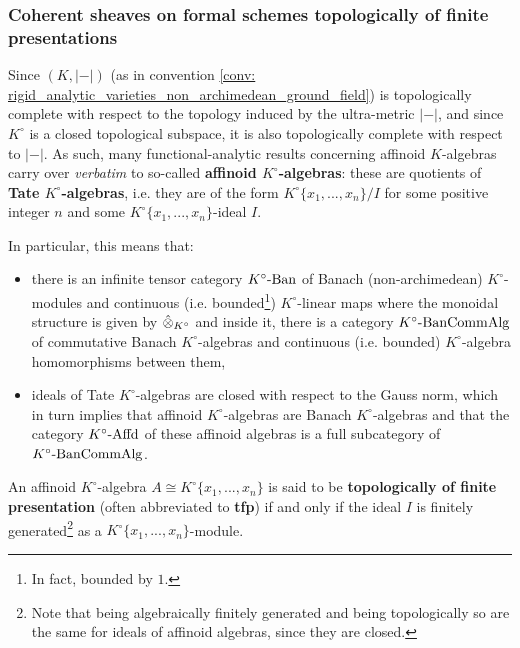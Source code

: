         \subsubsection{Coherent sheaves on formal schemes topologically of finite presentations}
            \begin{remark} \label{remark: affinoids_over_complete_valuation_rings}
                Since $(K, |-|)$ (as in convention \ref{conv: rigid_analytic_varieties_non_archimedean_ground_field}) is topologically complete with respect to the topology induced by the ultra-metric $|-|$, and since $K^{\circ}$ is a closed topological subspace, it is also topologically complete with respect to $|-|$. As such, many functional-analytic results concerning affinoid $K$-algebras carry over \textit{verbatim} to so-called \textbf{affinoid $K^{\circ}$-algebras}: these are quotients of \textbf{Tate $K^{\circ}$-algebras}, i.e. they are of the form $K^{\circ}\{x_1, ..., x_n\}/I$ for some positive integer $n$ and some $K^{\circ}\{x_1, ..., x_n\}$-ideal $I$.
                
                In particular, this means that:
                    \begin{itemize}
                        \item there is an infinite tensor category $K^{\circ}\text{-}\mathrm{Ban}$ of Banach (non-archimedean) $K^{\circ}$-modules and continuous (i.e. bounded\footnote{In fact, bounded by $1$.}) $K^{\circ}$-linear maps where the monoidal structure is given by $\hattensor_{K^{\circ}}$ and inside it, there is a category $K^{\circ}\text{-}\mathrm{Ban}\mathrm{Comm}\mathrm{Alg}$ of commutative Banach $K^{\circ}$-algebras and continuous (i.e. bounded) $K^{\circ}$-algebra homomorphisms between them,
                        \item ideals of Tate $K^{\circ}$-algebras are closed with respect to the Gauss norm, which in turn implies that affinoid $K^{\circ}$-algebras are Banach $K^{\circ}$-algebras and that the category $K^{\circ}\text{-}\mathrm{Affd}$ of these affinoid algebras is a full subcategory of $K^{\circ}\text{-}\mathrm{Ban}\mathrm{Comm}\mathrm{Alg}$.
                    \end{itemize}
            \end{remark}
            \begin{definition} \label{def: affinoid_algebras_topologically_of_finite_presentation}
                An affinoid $K^{\circ}$-algebra $A \cong K^{\circ}\{x_1, ..., x_n\}$ is said to be \textbf{topologically of finite presentation} (often abbreviated to \textbf{tfp}) if and only if the ideal $I$ is finitely generated\footnote{Note that being algebraically finitely generated and being topologically so are the same for ideals of affinoid algebras, since they are closed.} as a $K^{\circ}\{x_1, ..., x_n\}$-module. 
            \end{definition}
